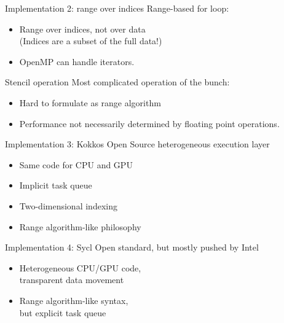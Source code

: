 \documentclass[10pt]{beamer}
\begin{document}
\begin{numberedframe}{Implementation 2: range over indices}
  Range-based for loop:
  \begin{itemize}
  \item Range over indices, not over data\\
    (Indices are a subset of the full data!)
  \item OpenMP can handle iterators.
  \end{itemize}
\end{numberedframe}

\begin{numberedframe}{Stencil operation}
  Most complicated operation of the bunch:
  \begin{itemize}
  \item Hard to formulate as range algorithm
  \item Performance not necessarily determined by floating point operations.
  \end{itemize}
\end{numberedframe}

\begin{numberedframe}{Implementation 3: Kokkos}
  Open Source heterogeneous execution layer
  \begin{itemize}
  \item Same code for CPU and GPU
  \item Implicit task queue
  \item Two-dimensional indexing
  \item Range algorithm-like philosophy
  \end{itemize}
\end{numberedframe}

\begin{numberedframe}{Implementation 4: Sycl}
  Open standard, but mostly pushed by Intel
  \begin{itemize}
  \item Heterogeneous CPU/GPU code,\\
    transparent data movement
  \item Range algorithm-like syntax,\\
    but explicit task queue
  \end{itemize}
\end{numberedframe}
\end{document}
